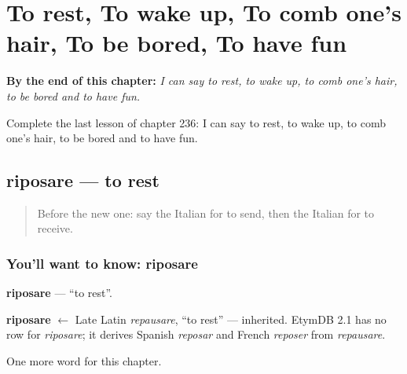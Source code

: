 
\chapter{To rest, To wake up, To comb one's hair, To be bored, To have fun}
\label{ch:it-to-rest-to-wake-up-to-comb-one-s-hair-to-be-bored-to-have-fun}

\begin{chapteropening}
\textbf{By the end of this chapter:} \emph{I can say to rest, to wake up, to comb one's hair, to be bored and to have fun.}

Complete the last lesson of chapter 236: I can say to rest, to wake up, to comb one's hair, to be bored and to have fun.
\end{chapteropening}

\section[riposare]{riposare — to rest}

\label{lesson:IT-C236-riposare}



\begin{quote}
Before the new one: say the Italian for to send, then the Italian for to receive.
\end{quote}

\subsection*{You'll want to know: riposare}
\textbf{riposare} — \textquotedblleft{}to rest\textquotedblright{}.

\begin{cousinweb}
\textbf{riposare} $\leftarrow$ Late Latin \emph{repausare}, \textquotedblleft{}to rest\textquotedblright{} — inherited. EtymDB 2.1 has no row for \emph{riposare}; it derives Spanish \emph{reposar} and French \emph{reposer} from \emph{repausare}.
\end{cousinweb}

\begin{grammarlens}[title={What you've built}]
One more word for this chapter.
\end{grammarlens}

